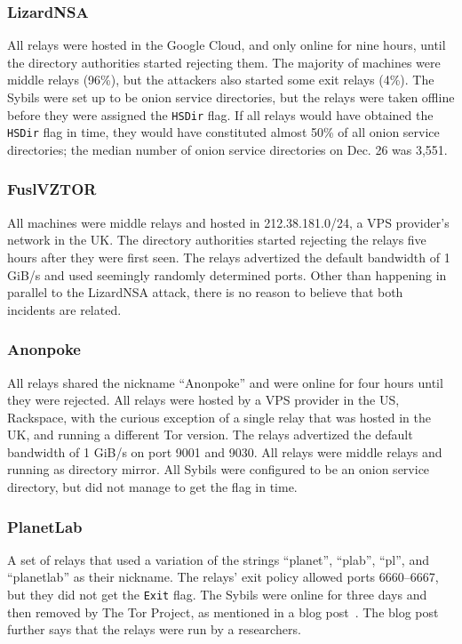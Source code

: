 \subsubsection{LizardNSA}
\label{sec:lizardnsa-sybils}
All relays were hosted in the Google Cloud, and only online for nine hours,
until the directory authorities started rejecting them.  The majority of
machines were middle relays (96\%), but the attackers also started some exit
relays (4\%).  The Sybils were set up to be onion service directories, but the
relays were taken offline before they were assigned the \texttt{HSDir} flag.  If
all relays would have obtained the \texttt{HSDir} flag in time, they would have
constituted almost 50\% of all onion service directories; the median number of
onion service directories on Dec. 26 was 3,551.

\subsubsection{FuslVZTOR}
\label{sec:fuslvztor-sybils}
All machines were middle relays and hosted in 212.38.181.0/24, a VPS provider's
network in the UK.  The directory authorities started rejecting the relays five
hours after they were first seen.  The relays advertized the default bandwidth
of 1 GiB/s and used seemingly randomly determined ports.  Other than happening
in parallel to the LizardNSA attack, there is no reason to believe that both
incidents are related.

\subsubsection{Anonpoke}
\label{sec:anonpoke-sybils}
All relays shared the nickname ``Anonpoke'' and were online for four hours until
they were rejected.  All relays were hosted by a VPS provider in the US,
Rackspace, with the curious exception of a single relay that was hosted in the
UK, and running a different Tor version.  The relays advertized the default
bandwidth of 1 GiB/s on port 9001 and 9030.  All relays were middle relays and
running as directory mirror.  All Sybils were configured to be an onion service
directory, but did not manage to get the flag in time.

\subsubsection{PlanetLab}
\label{sec:planetlab-sybils}
A set of relays that used a variation of the strings ``planet'', ``plab'',
``pl'', and ``planetlab'' as their nickname.  The relays' exit policy allowed
ports 6660--6667, but they did not get the \texttt{Exit} flag.  The Sybils were
online for three days and then removed by The Tor Project, as mentioned in a
blog post~\cite{progressreport}.  The blog post further says that the relays
were run by a researchers.

